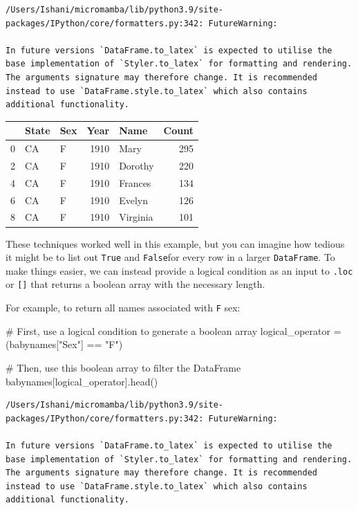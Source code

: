 \documentclass[
  letterpaper,
  DIV=11,
  numbers=noendperiod]{scrreprt}
\newenvironment{Shaded}{\begin{snugshade}}{\end{snugshade}}
\newcommand{\CommentTok}[1]{\textcolor[rgb]{0.37,0.37,0.37}{#1}}
\newcommand{\NormalTok}[1]{\textcolor[rgb]{0.00,0.23,0.31}{#1}}
\newcommand{\OperatorTok}[1]{\textcolor[rgb]{0.37,0.37,0.37}{#1}}
\newcommand{\StringTok}[1]{\textcolor[rgb]{0.13,0.47,0.30}{#1}}
\begin{document}
\begin{verbatim}
/Users/Ishani/micromamba/lib/python3.9/site-packages/IPython/core/formatters.py:342: FutureWarning:

In future versions `DataFrame.to_latex` is expected to utilise the base implementation of `Styler.to_latex` for formatting and rendering. The arguments signature may therefore change. It is recommended instead to use `DataFrame.style.to_latex` which also contains additional functionality.
\end{verbatim}

\begin{tabular}{lllrlr}
\toprule
{} & State & Sex &  Year &      Name &  Count \\
\midrule
0 &    CA &   F &  1910 &      Mary &    295 \\
2 &    CA &   F &  1910 &   Dorothy &    220 \\
4 &    CA &   F &  1910 &   Frances &    134 \\
6 &    CA &   F &  1910 &    Evelyn &    126 \\
8 &    CA &   F &  1910 &  Virginia &    101 \\
\bottomrule
\end{tabular}

These techniques worked well in this example, but you can imagine how
tedious it might be to list out \texttt{True} and \texttt{False}for
every row in a larger \texttt{DataFrame}. To make things easier, we can
instead provide a logical condition as an input to \texttt{.loc} or
\texttt{{[}{]}} that returns a boolean array with the necessary length.

For example, to return all names associated with \texttt{F} sex:

\begin{Shaded}
\begin{Highlighting}[]
\CommentTok{\# First, use a logical condition to generate a boolean array}
\NormalTok{logical\_operator }\OperatorTok{=}\NormalTok{ (babynames[}\StringTok{"Sex"}\NormalTok{] }\OperatorTok{==} \StringTok{"F"}\NormalTok{)}

\CommentTok{\# Then, use this boolean array to filter the DataFrame}
\NormalTok{babynames[logical\_operator].head()}
\end{Highlighting}
\end{Shaded}

\begin{verbatim}
/Users/Ishani/micromamba/lib/python3.9/site-packages/IPython/core/formatters.py:342: FutureWarning:

In future versions `DataFrame.to_latex` is expected to utilise the base implementation of `Styler.to_latex` for formatting and rendering. The arguments signature may therefore change. It is recommended instead to use `DataFrame.style.to_latex` which also contains additional functionality.
\end{verbatim}
\end{document}
